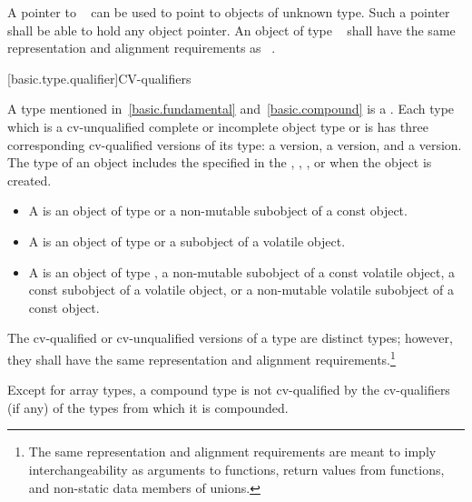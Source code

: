 \pnum
{}%
%
A pointer to \cv{}~
can be used to point to objects of
unknown type. Such a pointer shall be able to hold any object pointer.
An object of type \cv{}~
shall have the same representation and alignment
requirements as \cv{}~.

[basic.type.qualifier]{CV-qualifiers}

\pnum
{}%
%
%
A type mentioned in~\ref{basic.fundamental} and~\ref{basic.compound} is
a . Each type which is a
cv-unqualified complete or incomplete object type or is
 has three corresponding cv-qualified
versions of its type: a  version, a
 version, and a
 version. The
type of an object includes the 
specified in the ,
,
, or
 when the object is created.
\begin{itemize}
\item A  is an object of type  or a
  non-mutable subobject of a const object.

\item A  is an object of type
   or a subobject of a volatile object.

\item A  is an object of type
  , a non-mutable subobject of a const volatile object,
  a const subobject of a volatile object, or a non-mutable volatile
  subobject of a const object.
\end{itemize}
The cv-qualified or
cv-unqualified versions of a type
are distinct types; however, they shall have the same representation and
alignment requirements.\footnote{The same representation
and alignment requirements are meant to imply
interchangeability as arguments to functions, return values from
functions, and non-static data members of unions.}

\pnum
Except for array types, a compound type is not cv-qualified by the
cv-qualifiers (if any) of the types from which it is compounded.

